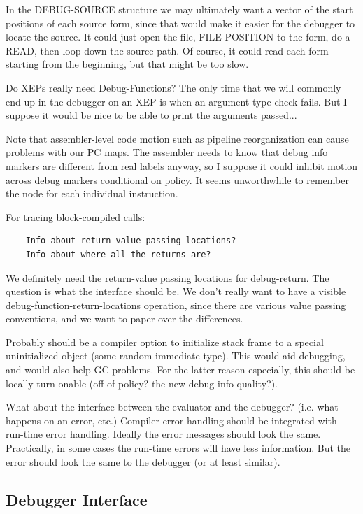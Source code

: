 In the DEBUG-SOURCE structure we may ultimately want a vector of the start
positions of each source form, since that would make it easier for the debugger
to locate the source.  It could just open the file, FILE-POSITION to the form,
do a READ, then loop down the source path.  Of course, it could read each form
starting from the beginning, but that might be too slow.


Do XEPs really need Debug-Functions?  The only time that we will commonly end
up in the debugger on an XEP is when an argument type check fails.  But I
suppose it would be nice to be able to print the arguments passed...


Note that assembler-level code motion such as pipeline reorganization can cause
problems with our PC maps.  The assembler needs to know that debug info markers
are different from real labels anyway, so I suppose it could inhibit motion
across debug markers conditional on policy.  It seems unworthwhile to remember
the node for each individual instruction.


For tracing block-compiled calls:
\begin{verbatim}
    Info about return value passing locations?
    Info about where all the returns are?
\end{verbatim}

We definitely need the return-value passing locations for debug-return.  The
question is what the interface should be.  We don't really want to have a
visible debug-function-return-locations operation, since there are various
value passing conventions, and we want to paper over the differences.


Probably should be a compiler option to initialize stack frame to a special
uninitialized object (some random immediate type).  This would aid debugging,
and would also help GC problems.  For the latter reason especially, this should
be locally-turn-onable (off of policy?  the new debug-info quality?).


What about the interface between the evaluator and the debugger? (i.e. what
happens on an error, etc.)  Compiler error handling should be integrated with
run-time error handling.  Ideally the error messages should look the same.
Practically, in some cases the run-time errors will have less information.  But
the error should look the same to the debugger (or at least similar).


\subsection{Debugger Interface}


